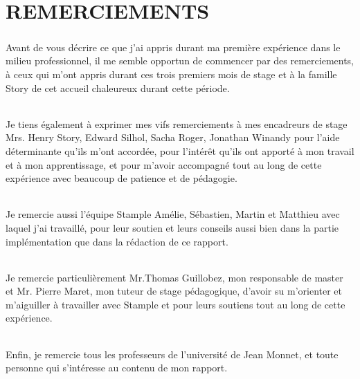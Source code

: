 \chapter{REMERCIEMENTS}
\paragraph{}
Avant de vous décrire ce que j'ai appris durant ma première expérience dans le milieu 
professionnel, il me semble opportun de commencer par des remerciements, à ceux qui m'ont 
appris durant ces trois premiers mois de stage et à la famille Story de cet accueil chaleureux 
durant cette période.
\subparagraph{}
Je tiens également à exprimer mes vifs remerciements à mes encadreurs de stage Mrs. Henry 
Story, Edward Silhol, Sacha Roger, Jonathan Winandy pour l'aide déterminante qu'ils m’ont accordée, pour l'intérêt qu'ils ont apporté à mon travail et 
à mon apprentissage, et pour m’avoir accompagné tout au long de cette expérience avec 
beaucoup de patience et de pédagogie.
\subparagraph{}
Je remercie aussi l'équipe Stample Amélie, Sébastien, Martin et Matthieu avec 
laquel j'ai travaillé, pour leur soutien et leurs conseils aussi bien dans la partie 
implémentation que dans la rédaction de ce rapport.
\subparagraph{}
Je remercie particulièrement Mr.Thomas Guillobez, mon responsable de master et  Mr. Pierre Maret, mon tuteur de stage pédagogique, d'avoir su 
m'orienter et m'aiguiller à travailler avec Stample et pour leurs soutiens tout au long de cette 
expérience.
\subparagraph{}
Enfin, je remercie tous les professeurs de l'université de Jean Monnet, et toute personne qui 
s'intéresse au contenu de mon rapport.